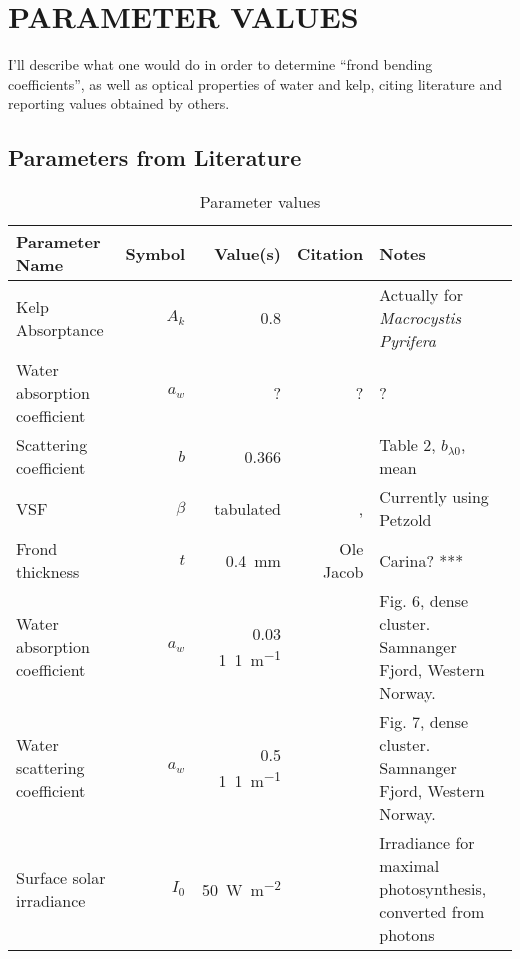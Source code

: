 \chapter{PARAMETER VALUES}
\label{chap:parameters}

I'll describe what one would do in order to determine
``frond bending coefficients'', as well as optical properties of water and kelp,
citing literature and reporting values obtained by others.

\section{Parameters from Literature}
\begin{table}
  \centering
  \begin{tabular}{p{}rrrp{}}
    \toprule
    Parameter Name & Symbol & Value(s) & Citation & Notes \\
    \midrule
    Kelp Absorptance & $A_k$ & 0.8 & \cite{colombo-pallotta_photosynthetic_2006} & Actually for \textit{Macrocystis Pyrifera}\\
    Water absorption coefficient & $a_w$ & ? & ? & ? \\
    Scattering coefficient & $b$ & 0.366 & \cite{sokolov_parameterization_2010} & Table 2, $b_{\lambda 0}$, mean \\
    VSF & $\beta$ & tabulated & \cite{petzold_volume_1972,sokolov_parameterization_2010}, & Currently using Petzold \\ 
    Frond thickness & $t$ & \SI{0.4}{\mm} & Ole Jacob & Carina?  *** \\
    Water absorption coefficient & $a_w$ & 0.03 \SI{1}{1\per\m} & \cite{hamre_parameterization_2003} & Fig. 6, dense cluster. Samnanger Fjord, Western Norway. \\
    Water scattering coefficient & $a_w$ & 0.5 \SI{1}{1\per\m} & \cite{hamre_parameterization_2003} & Fig. 7, dense cluster. Samnanger Fjord, Western Norway. \\
    Surface solar irradiance & $I_0$ & \SI{50}{\W\per\m\squared} & \cite{broch_modelling_2012} & Irradiance for maximal photosynthesis, converted from photons \\
    \bottomrule
  \end{tabular}
  \caption{Parameter values}
\end{table}


